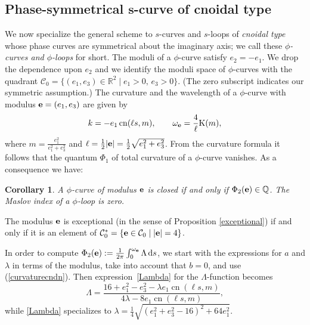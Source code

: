 \documentclass[10pt,a4paper]{amsart}
\newcommand\kk{k} %
\def\R{\mathbb R}
\newcommand\be{{\bf e}}
\newcommand\cn{\operatorname{cn}}
\numberwithin{equation}{section}
\newtheorem{Corollary}[Theorem]{Corollary}
\begin{document}
\subsection[Phase-symmetrical s-curve of cnoidal type]{Phase-symmetrical $\boldsymbol{s}$-curve of cnoidal type}

We now specialize the general scheme to $s$-curves and $s$-loops of \emph{cnoidal type} whose phase curves are symmetrical about the imaginary axis; we call these {\it $\phi$-curves and $\phi$-loops} for short.
The moduli of a $\phi$-curve satisfy
$e_2=-e_1$. We drop the dependence upon $e_2$ and we identify the moduli space
of $\phi$-curves with the quadrant
${\mathcal C}_0=\bigl\{(e_1,e_3)\in \R^2 \mid e_1>0, \, e_3>0\bigr\}$.
(The zero subscript indicates our symmetric assumption.)
The curvature and the wavelength of a $\phi$-curve with modulus $\be=(e_1,e_3)$ are given by
\begin{equation}\label{curvaturecndn}
\kk =
-e_1\cn(\ell s,m),\qquad
\omega_\be=
\frac{4}{\ell}{\rm K}(m),
\end{equation}
where $m=\frac{e_1^2}{e_1^2+e_3^2}$ and $\ell = \frac12 |\be|=\frac12 \sqrt{e_1^2 + e_3^2}$.
From the curvature formula it follows that the quantum $\Phi_1$ of total curvature of a $\phi$-curve vanishes. As a consequence we have:

\begin{Corollary} A $\phi$-curve of modulus $\be$ is closed if and only if $\Phi_2(\be)\in {\mathbb Q}$. The Maslov index of a $\phi$-loop is zero.
\end{Corollary}

\begin{Remark} The modulus $\be$ is exceptional (in the sense of Proposition \ref{exceptional}) if and only if it is an element of ${\mathcal C}^{*}_0=\{\be\in {\mathcal C}_0 \mid |\be|=4\}$.
\end{Remark}

In order to compute $\Phi_2(\be):=\frac{1}{2\pi}\int_0^{\omega_\be} \Lambda \, {\rm d}s$, we start with the expressions for $a$ and $\lambda$ in terms of the modulus, take into account that $b=0$, and use (\ref{curvaturecndn}). Then expression~\eqref{Lambda} for the $\Lambda$-function becomes
\begin{equation}\label{Lambda2} \Lambda = \dfrac{ 16+e_1^2-e_3^2 -\lambda e_1 \cn(\ell s, m)}{4\lambda - 8 e_1 \cn(\ell s, m)},
\end{equation}
while \eqref{Lambda} specializes to $\lambda = \tfrac14 \sqrt{(e_1^2+e_3^2-16)^2 + 64 e_1^2}$.
\end{document}
